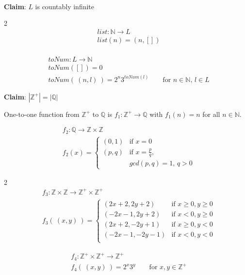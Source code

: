 \documentclass[12pt, oneside]{article}
\begin{document}
\vspace{50pt}


{\bf Claim}: $L$ is countably infinite

\begin{multicols}{2}
\begin{align*}
    &list: \mathbb{N} \to L \\
    &list(n) = (n, []) \\
    &
\end{align*}

\begin{align*}
    &toNum: L \to \mathbb{N} \\
    &toNum([]) = 0 \\
    &toNum( ~(n,l)~) = 2^n 3^{toNum(l)} \qquad \text{for $n \in \mathbb{N}$, $l \in L$}
\end{align*}
\end{multicols}
\vspace{30pt}

{\bf Claim}: $|\mathbb{Z}^+| = |\mathbb{Q}|$ 

One-to-one function from $\mathbb{Z}^+$ to $\mathbb{Q}$
is $f_1: \mathbb{Z}^+ \to \mathbb{Q}$ with $f_1(n) = n$ for all 
$n \in \mathbb{N}$.

\vspace{30pt}


\begin{align*}
    &f_2: \mathbb{Q} \to \mathbb{Z} \times \mathbb{Z} \\
    &f_2(x) = \begin{cases}
        (0,1) & \text{if $x = 0$} \\
        (p,q) & \text{if $x = \frac{p}{q}$,}\\
                & \text{$gcd(p,q) = 1$, $q > 0$}
    \end{cases}
\end{align*}
\begin{multicols}{2}
\begin{align*}
    &f_3: \mathbb{Z} \times \mathbb{Z} \to \mathbb{Z}^+ \times \mathbb{Z}^+ \\
    &f_3(~(x,y)~) = \begin{cases}
        (2x+2, 2y+2) & \text{if $x \geq 0, y \geq 0$} \\
        (-2x-1, 2y+2) & \text{if $x < 0, y \geq 0$} \\
        (2x+2, -2y+1) & \text{if $x \geq 0, y < 0$} \\
        (-2x-1, -2y-1) & \text{if $x < 0, y < 0$} \\
    \end{cases}
\end{align*}

\begin{align*}
    &f_4: \mathbb{Z}^+ \times \mathbb{Z}^+ \to \mathbb{Z}^+ \\
    &f_4(~(x,y)~) = 2^x 3^y \qquad \text{for $x,y \in \mathbb{Z}^+$}
\end{align*}
\end{multicols} \vfill
\end{document}
